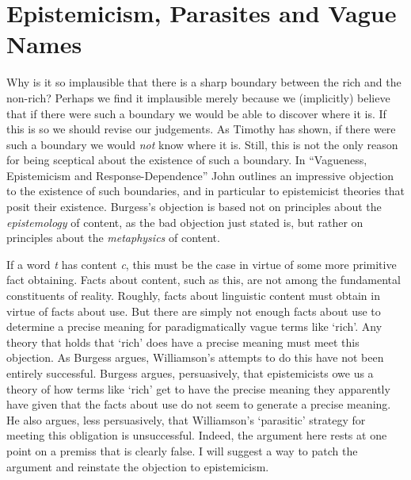 %
%
%
%
%
%
%
%
%
%
\chapter{Epistemicism, Parasites and Vague Names}


Why is it so implausible that there is a sharp boundary between the rich and the non-rich? Perhaps we find it implausible merely because we (implicitly) believe that if there were such a boundary we would be able to discover where it is. If this is so we should revise our judgements. As Timothy \citet{Williamson1994-WILV, Williamson2000-WILKAI} has shown, if there were such a boundary we would \textit{not} know where it is. Still, this is not the only reason for being sceptical about the existence of such a boundary. In ``Vagueness, Epistemicism and Response-Dependence'' John \citeauthor{Burgess2001} outlines an impressive objection to the existence of such boundaries, and in particular to epistemicist theories that posit their existence. Burgess's objection is based not on principles about the \textit{epistemology} of content, as the bad objection just stated is, but rather on principles about the \textit{metaphysics} of content.

If a word \textit{t} has content \textit{c}, this must be the case in virtue of some more primitive fact obtaining. Facts about content, such as this, are not among the fundamental constituents of reality. Roughly, facts about linguistic content must obtain in virtue of facts about use. But there are simply not enough facts about use to determine a precise meaning for paradigmatically vague terms like `rich'. Any theory that holds that `rich' does have a precise meaning must meet this objection. As Burgess argues, Williamson's attempts to do this have not been entirely successful. Burgess argues, persuasively, that epistemicists owe us a theory of how terms like `rich' get to have the precise meaning they apparently have given that the facts about use do not seem to generate a precise meaning. He also argues, less persuasively, that Williamson's `parasitic' strategy for meeting this obligation is unsuccessful. Indeed, the argument here rests at one point on a premiss that is clearly false. I will suggest a way to patch the argument and reinstate the objection to epistemicism.

